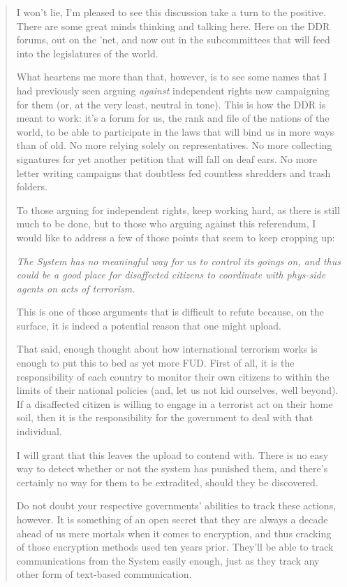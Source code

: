 \begin{quote}
I won't lie, I'm pleased to see this discussion take a turn to the positive. There are some great minds thinking and talking here. Here on the DDR forums, out on the 'net, and now out in the subcommittees that will feed into the legislatures of the world.

What heartens me more than that, however, is to see some names that I had previously seen arguing \emph{against} independent rights now campaigning for them (or, at the very least, neutral in tone). This is how the DDR is meant to work: it's a forum for us, the rank and file of the nations of the world, to be able to participate in the laws that will bind us in more ways than of old. No more relying solely on representatives. No more collecting signatures for yet another petition that will fall on deaf ears. No more letter writing campaigns that doubtless fed countless shredders and trash folders.

To those arguing for independent rights, keep working hard, as there is still much to be done, but to those who arguing against this referendum, I would like to address a few of those points that seem to keep cropping up:

\emph{The System has no meaningful way for us to control its goings on, and thus could be a good place for disaffected citizens to coordinate with phys-side agents on acts of terrorism.}

This is one of those arguments that is difficult to refute because, on the surface, it is indeed a potential reason that one might upload.

That said, enough thought about how international terrorism works is enough to put this to bed as yet more FUD. First of all, it is the responsibility of each country to monitor their own citizens to within the limits of their national policies (and, let us not kid ourselves, well beyond). If a disaffected citizen is willing to engage in a terrorist act on their home soil, then it is the responsibility for the government to deal with that individual.

I will grant that this leaves the upload to contend with. There is no easy way to detect whether or not the system has punished them, and there's certainly no way for them to be extradited, should they be discovered.

Do not doubt your respective governments' abilities to track these actions, however. It is something of an open secret that they are always a decade ahead of us mere mortals when it comes to encryption, and thus cracking of those encryption methods used ten years prior. They'll be able to track communications from the System easily enough, just as they track any other form of text-based communication.


\end{quote}
